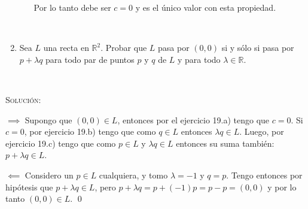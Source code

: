 \documentclass[a4paper,12pt,twoside,spanish,reqno]{amsbook}
\numberwithin{equation}{section}
\newcommand{\rta}{\noindent\textsc{Solución: }}
\begin{document}
\begin{enumerate}[resume]
\begin{enumerate}
Por lo tanto debe ser $c=0$ y es el único valor con esta propiedad.
 
\end{enumerate}

\

\item Sea $L$ una recta en $\mathbb{R}^2$. Probar que $L$ pasa por $(0,0)$ si y s\'olo si pasa por $p+\lambda q$ para todo par de puntos $p$ y $q$ de $L$ y para todo $\lambda\in\mathbb{R}$.
\end{enumerate}

\

\rta 

$\boxed{ \implies }$ Supongo que $(0,0) \in L$, entonces por el ejercicio 19.a) tengo que $c=0$. Si $c=0$, por ejercicio 19.b) tengo que como $q \in L$ entonces $\lambda q \in L$. Luego, por ejercicio 19.c) tengo que como $p \in L$ y $\lambda q \in L$ entonces su suma también: $p + \lambda q \in L$.

$\boxed{ \impliedby }$ Considero un $p \in L$ cualquiera, y tomo $\lambda = -1$ y $q = p$. Tengo entonces por hipótesis que $p + \lambda q \in L$, pero $p + \lambda q = p + (-1) p = p - p = (0,0)$ y por lo tanto $(0,0) \in L$. \qed
\end{document}

